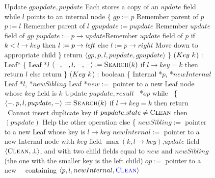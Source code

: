 \begin{figure*}
\begin{code}
		Update $gpupdate, pupdate$ \tabtabcom Each stores a copy of an $update$ field\bl\nlc
		while $l$ points to an internal node \{ \nlc%
		\n         $gp := p$ \tabtabcom Remember parent of $p$\nlc
		$p := l$ \tabtabcom Remember parent of $l$\nlc
		$gpupdate := pupdate$ \tabtabcom Remember $update$ field of $gp$\nlc
		$pupdate := p\rightarrow update$\label{store-pupdate}\tabtabcom Remember $update$ field of $p$\nlc  
		if $k < l\rightarrow key$ then $l:= p\rightarrow \mbox{\it left}$ else $l:=p \rightarrow right$ \label{read-child}\tabtabcom Move down to appropriate child\nlc
		\p \} \nlc
		return $\langle gp, p, l, pupdate, gpupdate \rangle$ \nlc
		\p 
		\}\bl
		\nlc
		($Key\ k$) : Leaf* \{ \nlc
		\n   Leaf *$l$\bl
		\nlc
		$\langle -,-,l,-,-\rangle := \mbox{\sc Search}(k)$\nlc
		if $l\rightarrow key = k$ then return $l$\nlc
		else return \NULL\nlc
		\p
		\}\bl
		\nlc
		($Key\ k$) : boolean \{ \nlc
		\n Internal *$p$, *$newInternal$\nlc 
		Leaf *$l$, *$newSibling$\nlc 
		Leaf *$new :=$ pointer to a new Leaf node whose $key$ field is $k$  \nlc
		Update $pupdate, result$\nlc
		\IFlag\ *$op$\bl\nlc%
		while \TRUE\ \{  \nlc
		\n $\langle -, p, l, pupdate, - \rangle := \mbox{\sc Search}(k)$ \label{ins-search}\nlc
		if $l \rightarrow key = k$ then return \FALSE\ \tabtabcom Cannot insert duplicate key\label{insert-false}\nlc
		if $pupdate.state \neq \mbox{\sc Clean}$ then $(pupdate)$ \tabtabcom Help the other operation \label{ins-help-unclean}\nlc
		else \{\nlc
		\n        $newSibling :=$ pointer to a new Leaf whose key is $l\rightarrow key$\nlc
		$newInternal :=$ pointer to a new Internal node with $key$ field $\max(k, l \rightarrow key)$,\label{create-internal}\ul      
		\n      $update$ field $\langle \mbox{\sc Clean}, \mbox{$\bot$}\rangle$, and with two
		child fields equal to $new$ and $newSibling$\ul 
		(the one with the smaller key is the left child)\nlc
		\p        $op :=$ pointer to a new \IFlag\ \record\  containing $\langle p, l, newInternal, \textcolor{blue}{\mbox{\sc Clean}}\rangle$\label{new-IFlag}\nlc

\end{code}
\end{figure*}
